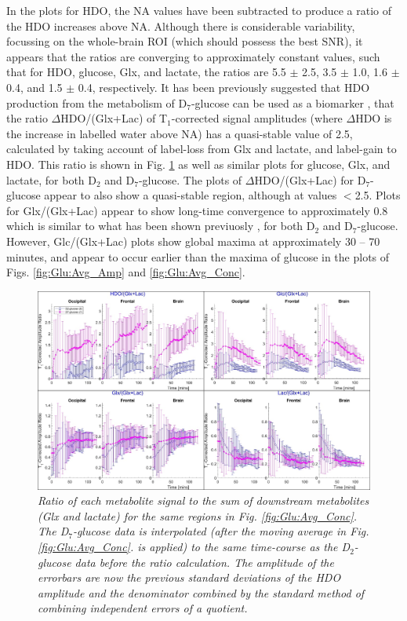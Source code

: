 In the plots for \ac{HDO}, the \ac{NA} values have been subtracted to produce a ratio of the \ac{HDO} increases above \ac{NA}. Although there is considerable variability, focussing on the whole-brain \ac{ROI} (which should possess the best \ac{SNR}), it appears that the ratios are converging to approximately constant values, such that for \ac{HDO}, glucose, Glx, and lactate, the ratios are 5.5 $\pm$ 2.5, 3.5 $\pm$ 1.0, 1.6 $\pm$ 0.4, and 1.5 $\pm$ 0.4, respectively. It has been previously suggested that \ac{HDO} production from the metabolism of D$_7$-glucose can be used as a biomarker \cite{Mahar2021DeuteratedGlucose}, that the ratio $\Delta$HDO/(Glx+Lac) of T$_1$-corrected signal amplitudes (where $\Delta$HDO is the increase in labelled water above \ac{NA}) has a quasi-stable value of 2.5, calculated by taking account of label-loss from Glx and lactate, and label-gain to \ac{HDO}. This ratio is shown in Fig. \ref{fig:Glu:HDO_Rat} as well as similar plots for glucose, Glx, and lactate, for both D$_2$ and D$_7$-glucose. The plots of $\Delta$HDO/(Glx+Lac) for D$_7$-glucose appear to also show a quasi-stable region, although at values $<$2.5. Plots for Glx/(Glx+Lac) appear to show long-time convergence to approximately 0.8 which is similar to what has been shown previuosly \cite{Kaggie2022DeuteriumMetabolism}, for both D$_2$ and D$_7$-glucose. However, Glc/(Glx+Lac) plots show global maxima at approximately 30 – 70 minutes, and appear to occur earlier than the maxima of glucose in the plots of Figs. \ref{fig:Glu:Avg_Amp} and \ref{fig:Glu:Avg_Conc}.  

\begin{figure}
    \centering
    \includegraphics[width = 1\textwidth]{Figures/Glucose/HDO_Ratio.png}
    \caption{\textit{Ratio of each metabolite signal to the sum of downstream metabolites (Glx and lactate) for the same regions in Fig. \ref{fig:Glu:Avg_Conc}. The D$_7$-glucose data is interpolated (after the moving average in Fig. \ref{fig:Glu:Avg_Conc}. is applied) to the same time-course as the D$_2$-glucose data before the ratio calculation. The amplitude of the errorbars are now the previous standard deviations of the \ac{HDO} amplitude and the denominator combined by the standard method of combining independent errors of a quotient.}}
    \label{fig:Glu:HDO_Rat}
\end{figure}


